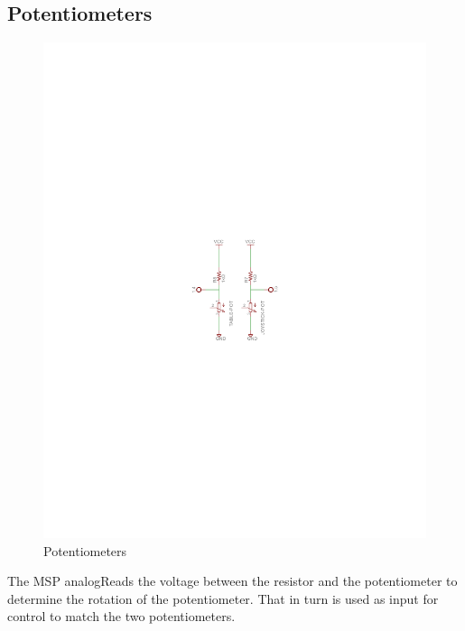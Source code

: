\documentclass[a4paper, 11pt]{article}
\begin{document}
	\subsection{Potentiometers}
	\begin{figure}[!ht]
		\centering
		\vspace{-11cm}
		\includegraphics{report-images/potentiometers}
		\vspace{-11.25cm}
		\caption{Potentiometers}
	\end{figure}
	\noindent The MSP analogReads the voltage between the resistor and the potentiometer to determine the rotation of the potentiometer.  That in turn is used as input for control to match the two potentiometers.  
\end{document}
